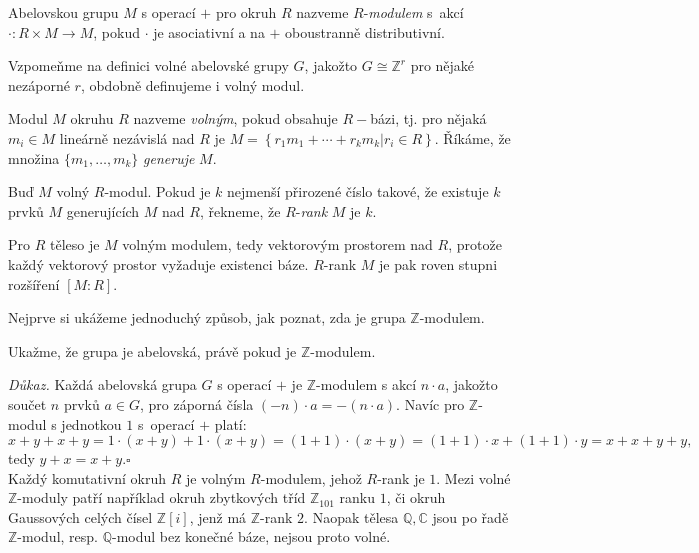 \documentclass[12pt]{report}
\begin{document}
\begin{definice}
Abelovskou grupu $M$ s operací $+$ pro okruh $R$ nazveme $R$-\textit{modulem} s~akcí $\cdot : R \times M \longrightarrow M$, pokud $\cdot$ je asociativní a na $+$ oboustranně distributivní.
\end{definice}

Vzpomeňme na definici volné abelovské grupy $G$, jakožto $G \cong \mathbb{Z}^r$ pro nějaké nezáporné $r$, obdobně definujeme i volný modul.
\begin{definice}
Modul $M$ okruhu $R$ nazveme \textit{volným}, pokud obsahuje $R-$bázi, tj. pro nějaká $m_i \in M$ lineárně nezávislá nad $R$ je $M = \left\lbrace r_1 m_1 + \cdots + r_k m_k \vert r_i \in R \right\rbrace$. Říkáme, že množina $\lbrace m_1,\dots,m_k \rbrace$ \textit{generuje} $M$.
\end{definice}

\begin{definice}
Buď $M$ volný $R$-modul. Pokud je $k$ nejmenší přirozené číslo takové, že existuje $k$ prvků $M$ generujících $M$ nad $R$, řekneme, že $R$-\textit{rank} $M$ je $k$.
\end{definice}

Pro $R$ těleso je $M$ volným modulem, tedy vektorovým prostorem nad $R$, protože každý vektorový prostor vyžaduje existenci báze. $R$-rank $M$ je pak roven stupni rozšíření $[M:R]$.

Nejprve si ukážeme jednoduchý způsob, jak poznat, zda je grupa $\mathbb{Z}$-modulem.

\begin{priklad}\label{modulgrupa}
Ukažme, že grupa je abelovská, právě pokud je $\mathbb{Z}$-modulem.
\end{priklad} 
\noindent \textit{Důkaz.} Každá abelovská grupa $G$ s operací $+$ je $\mathbb{Z}$-modulem s akcí $n \cdot a$, jakožto součet $n$ prvků $a \in G$, pro záporná čísla $(-n) \cdot a = - (n \cdot a)$. Navíc pro $\mathbb{Z}$-modul s jednotkou $1$ s~operací $+$ platí:
\begin{equation*}
x+y+x+y = 1\cdot (x+y) + 1 \cdot (x+y) = (1+1)\cdot (x+y) = (1+1)\cdot x + (1+1)\cdot y = x+x+y+y,
\end{equation*}
tedy $y+x = x+y$.\hfill $\square$\\

Každý komutativní okruh $R$ je volným $R$-modulem, jehož $R$-rank je $1$. Mezi volné $\mathbb{Z}$-moduly patří například okruh zbytkových tříd $\mathbb{Z}_{101}$ ranku $1$, či okruh Gaussových celých čísel $\mathbb{Z}[i]$, jenž má $\mathbb{Z}$-rank $2$. Naopak tělesa $\mathbb{Q}, \mathbb{C}$ jsou po řadě $\mathbb{Z}$-modul, resp. $\mathbb{Q}$-modul bez konečné báze, nejsou proto volné.
\end{document}
